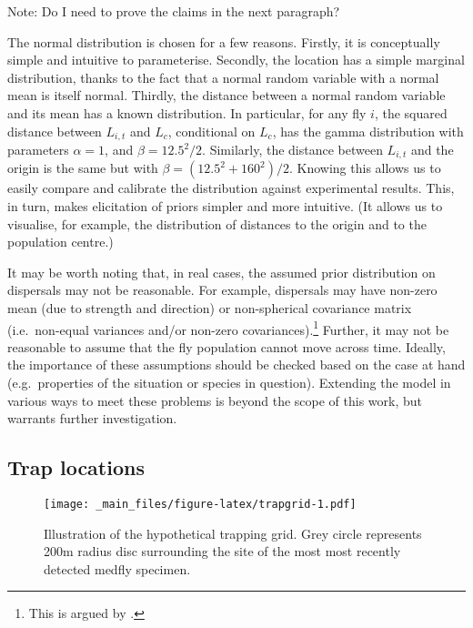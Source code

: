 \documentclass[
  oneside]{book}
\begin{document}
Note: Do I need to prove the claims in the next paragraph?

The normal distribution is chosen for a few reasons. Firstly, it is conceptually simple and intuitive to parameterise. Secondly, the location has a simple marginal distribution, thanks to the fact that a normal random variable with a normal mean is itself normal. Thirdly, the distance between a normal random variable and its mean has a known distribution. In particular, for any fly \(i\), the squared distance between \(L_{i,t}\) and \(L_c\), conditional on \(L_c\), has the gamma distribution with parameters \(\alpha = 1\), and \(\beta = 12.5^2 / 2\). Similarly, the distance between \(L_{i, t}\) and the origin is the same but with \(\beta = (12.5^2 + 160^2) / 2\). Knowing this allows us to easily compare and calibrate the distribution against experimental results. This, in turn, makes elicitation of priors simpler and more intuitive. (It allows us to visualise, for example, the distribution of distances to the origin and to the population centre.)

It may be worth noting that, in real cases, the assumed prior distribution on dispersals may not be reasonable. For example, dispersals may have non-zero mean (due to strength and direction) or non-spherical covariance matrix (i.e.~non-equal variances and/or non-zero covariances).\footnote{This is argued by \citet{baker1986}.} Further, it may not be reasonable to assume that the fly population cannot move across time. Ideally, the importance of these assumptions should be checked based on the case at hand (e.g.~properties of the situation or species in question). Extending the model in various ways to meet these problems is beyond the scope of this work, but warrants further investigation.

\hypertarget{trap-locations}{%
\subsection{Trap locations}\label{trap-locations}}

\begin{figure}
\centering
\texttt{[image: \_main\_files/figure-latex/trapgrid-1.pdf]}
\caption{\label{fig:trapgrid}Illustration of the hypothetical trapping grid. Grey circle represents 200m radius disc surrounding the site of the most most recently detected medfly specimen.}
\end{figure}
\end{document}
